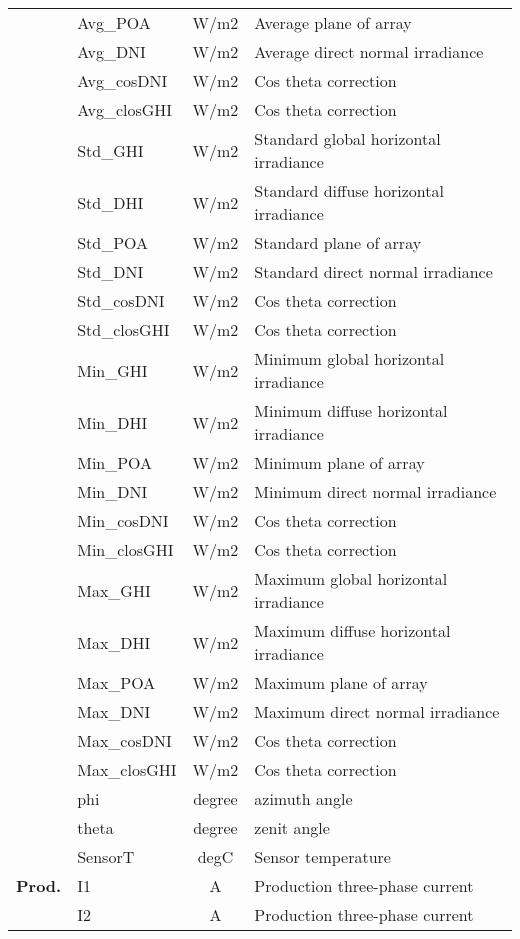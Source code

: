 \begin{longtable}{rlcl}
      & Avg\_POA & W/m2 & Average plane of array \\
      & Avg\_DNI & W/m2 & Average direct normal irradiance \\
      & Avg\_cosDNI & W/m2 & Cos theta correction \\
      & Avg\_closGHI & W/m2 & Cos theta correction \\
      & Std\_GHI & W/m2 & Standard global horizontal irradiance \\
      & Std\_DHI & W/m2 & Standard diffuse horizontal irradiance \\
      & Std\_POA & W/m2 & Standard plane of array \\
      & Std\_DNI & W/m2 & Standard direct normal irradiance \\
      & Std\_cosDNI & W/m2 & Cos theta correction \\
      & Std\_closGHI & W/m2 & Cos theta correction \\
      & Min\_GHI & W/m2 & Minimum global horizontal irradiance \\
      & Min\_DHI & W/m2 & Minimum diffuse horizontal irradiance \\
      & Min\_POA & W/m2 & Minimum plane of array \\
      & Min\_DNI & W/m2 & Minimum direct normal irradiance \\
      & Min\_cosDNI & W/m2 & Cos theta correction \\
      & Min\_closGHI & W/m2 & Cos theta correction \\
      & Max\_GHI & W/m2 & Maximum global horizontal irradiance \\
      & Max\_DHI & W/m2 & Maximum diffuse horizontal irradiance \\
      & Max\_POA & W/m2 & Maximum plane of array \\
      & Max\_DNI & W/m2 & Maximum direct normal irradiance \\
      & Max\_cosDNI & W/m2 & Cos theta correction \\
      & Max\_closGHI & W/m2 & Cos theta correction \\
      & phi & degree & azimuth angle \\
      & theta & degree & zenit angle \\
      & SensorT & degC & Sensor temperature \\
    \midrule
    \multicolumn{1}{l}{\textbf{Prod.}} & I1 & A & Production three-phase current \\
      & I2 & A & Production three-phase current \\

\end{longtable}
